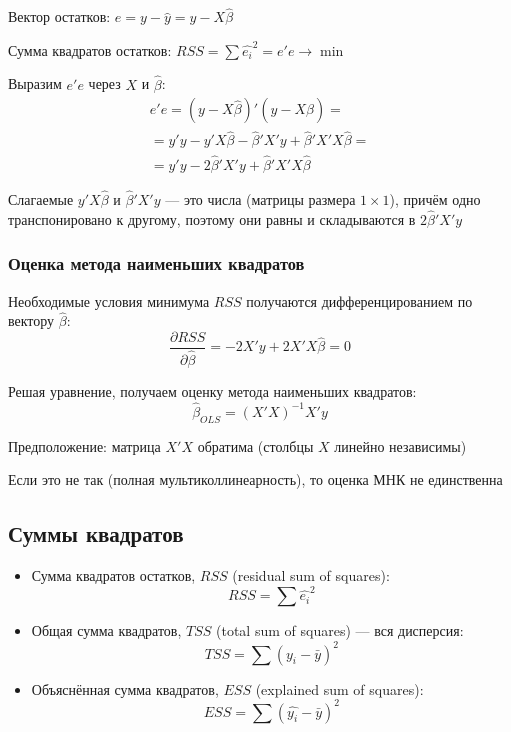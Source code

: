 \documentclass[12pt,a4paper]{article}
\numberwithin{equation}{section}
\theoremstyle{plain}
\theoremstyle{definition}
\theoremstyle{remark}
\begin{document}
Вектор остатков: $e = y - \hat{y} = y - X\hat{\beta}$

Сумма квадратов остатков: $RSS = \sum \hat{e_i}^2 = e'e \to \min$

Выразим $e'e$ через $X$ и $\hat{\beta}$:
\begin{gather*}
    e'e = \left(y - X\hat{\beta}\right)'\left(y - X\hat{\beta}\right) = \\
    = y'y - y'X\hat{\beta} - \hat{\beta}'X'y + \hat{\beta}'X'X\hat{\beta} = \\
    = y'y - 2\hat{\beta}'X'y + \hat{\beta}'X'X\hat{\beta}
\end{gather*}

Слагаемые $y'X\hat{\beta}$ и $\hat{\beta}'X'y$ — это числа (матрицы размера $1 \times 1$), причём одно транспонировано к другому, поэтому они равны и складываются в $2\hat{\beta}'X'y$

\subsubsection{Оценка метода наименьших квадратов}

Необходимые условия минимума $RSS$ получаются дифференцированием по вектору $\hat{\beta}$:
$$
    \frac{\partial RSS}{\partial \hat{\beta}} = -2X'y + 2X'X\hat{\beta} = 0
$$

Решая уравнение, получаем оценку метода наименьших квадратов:
$$
    \hat{\beta}_{OLS} = \left(X'X\right)^{-1}X'y
$$

Предположение: матрица $X'X$ обратима (столбцы $X$ линейно независимы)

Если это не так (полная мультиколлинеарность), то оценка МНК не единственна

\subsection{Суммы квадратов}

\begin{itemize}
    \item Сумма квадратов остатков, $RSS$ (residual sum of squares):
          $$
              RSS = \sum \hat{e_i}^2
          $$
    \item Общая сумма квадратов, $TSS$ (total sum of squares) — вся дисперсия:
          $$
              TSS = \sum \left(y_i - \bar{y}\right)^2
          $$
    \item Объяснённая сумма квадратов, $ESS$ (explained sum of squares):
          $$
              ESS = \sum \left(\hat{y_i} - \bar{y}\right)^2
          $$
\end{itemize}
\end{document}
